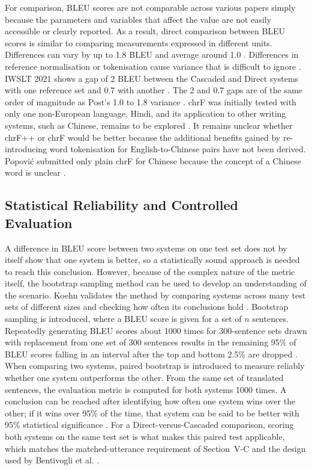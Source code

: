 For comparison, BLEU scores are not comparable across various papers simply
because the parameters and variables that affect the value are not easily
accessible or clearly reported. As a result, direct comparison between BLEU
scores is similar to comparing measurements expressed in different units.
Differences can vary by up to 1.8 BLEU and average around 1.0
\cite{post2018clarity}. Differences in reference normalisation or tokenisation
cause variance that is difficult to ignore \cite{post2018clarity}. IWSLT 2021
shows a gap of 2 BLEU between the Cascaded and Direct systems with one reference
set and 0.7 with another \cite{anastasopoulos2021iwslt}. The 2 and 0.7 gaps are
of the same order of magnitude as Post's 1.0 to 1.8 variance
\cite{post2018clarity}. chrF was initially tested with only one non-European
language, Hindi, and its application to other writing systems, such as Chinese,
remains to be explored \cite{popovic2015chrf}. It remains unclear whether
chrF++ or chrF would be better because the additional benefits gained by
re-introducing word tokenisation for English-to-Chinese pairs have not been
derived. Popovi\'c submitted only plain chrF for Chinese because the concept of
a Chinese word is unclear \cite{popovic2017chrfpp}.

\subsection{Statistical Reliability and Controlled Evaluation}

A difference in BLEU score between two systems on one test set does not by
itself show that one system is better, so a statistically sound approach is
needed to reach this conclusion. However, because of the complex nature of the
metric itself, the bootstrap sampling method can be used to develop an
understanding of the scenario. Koehn validates the method by comparing systems
across many test sets of different sizes and checking how often its conclusions
hold \cite{koehn2004significance}. Bootstrap sampling is introduced, where a
BLEU score is given for a set of $n$ sentences. Repeatedly generating BLEU
scores about 1000 times for 300-sentence sets drawn with replacement from one
set of 300 sentences results in the remaining 95\% of BLEU scores falling in an
interval after the top and bottom 2.5\% are dropped
\cite{koehn2004significance}. When comparing two systems, paired bootstrap is
introduced to measure reliably whether one system outperforms the other. From
the same set of translated sentences, the evaluation metric is computed for
both systems 1000 times. A conclusion can be reached after identifying how
often one system wins over the other; if it wins over 95\% of the time, that
system can be said to be better with 95\% statistical significance
\cite{koehn2004significance}. For a Direct-versus-Cascaded comparison, scoring
both systems on the same test set is what makes this paired test applicable,
which matches the matched-utterance requirement of Section~V-C and the design
used by Bentivogli et al. \cite{bentivogli2021cascade}.

